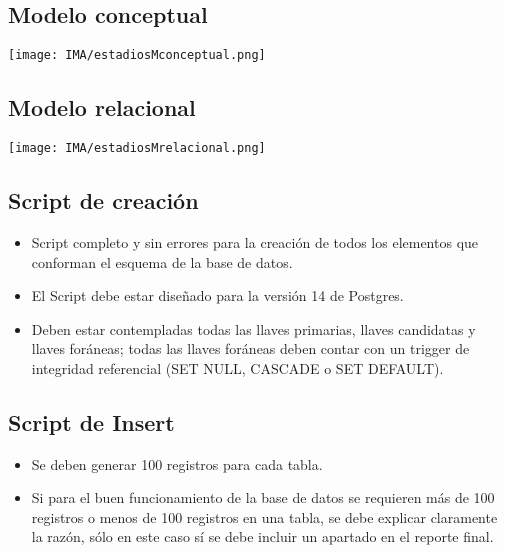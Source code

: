 \subsection{Modelo conceptual}
\begin{center}
    \texttt{[image: IMA/estadiosMconceptual.png]}
\end{center}


\subsection{Modelo relacional}
\begin{center}
    \texttt{[image: IMA/estadiosMrelacional.png]}
\end{center}


\subsection{Script de creación}

\begin{itemize}
    \item Script completo y sin errores para la creación de todos los elementos que conforman el esquema
            de la base de datos.
    \item El Script debe estar diseñado para la versión 14 de Postgres.
    \item Deben estar contempladas todas las llaves primarias, llaves candidatas y llaves foráneas;
    todas las llaves foráneas deben contar con un trigger de integridad referencial (SET NULL,
    CASCADE o SET DEFAULT).
\end{itemize}

\subsection{Script de Insert}
\begin{itemize}
    \item Se deben generar 100 registros para cada tabla.
    \item Si para el buen funcionamiento de la base de datos se requieren más de 100 registros o
            menos de 100 registros en una tabla, se debe explicar claramente la razón, sólo en este caso
            sí se debe incluir un apartado en el reporte final.
\end{itemize}
